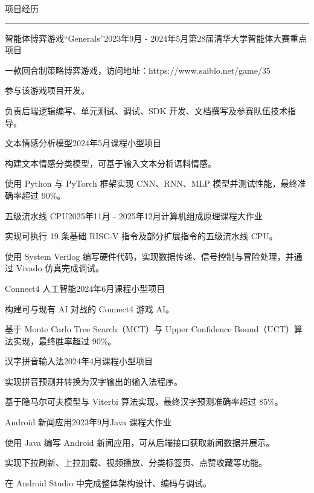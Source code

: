 \documentclass{resume} %
\renewenvironment{rSection}[1]{
\sectionskip
\textcolor{TsinghuaPurple}{\MakeUppercase{#1}}
\sectionlineskip
\hrule
\begin{list}{}{
\setlength{\leftmargin}{0em}
}
\item[]
}{
\end{list}
}
\begin{document}
\begin{rSection}{项目经历}

\begin{rSubsection}{智能体博弈游戏“Generals”}{2023年9月 - 2024年5月}{第28届清华大学智能体大赛重点项目}{}
\item 一款回合制策略博弈游戏，访问地址：https://www.saiblo.net/game/35
\item 参与该游戏项目开发。
\item 负责后端逻辑编写、单元测试、调试、SDK 开发、文档撰写及参赛队伍技术指导。
\end{rSubsection}  

\begin{rSubsection}{文本情感分析模型}{2024年5月}{课程小型项目}{} 
\item 构建文本情感分类模型，可基于输入文本分析语料情感。
\item 使用 Python 与 PyTorch 框架实现 CNN、RNN、MLP 模型并测试性能，最终准确率超过 90\%。
\end{rSubsection}

\begin{rSubsection}{五级流水线 CPU}{2025年11月 - 2025年12月}{计算机组成原理课程大作业}{}
\item 实现可执行 19 条基础 RISC-V 指令及部分扩展指令的五级流水线 CPU。
\item 使用 System Verilog 编写硬件代码，实现数据传递、信号控制与冒险处理，并通过 Vivado 仿真完成调试。
\end{rSubsection}

\begin{rSubsection}{Connect4 人工智能}{2024年6月}{课程小型项目}{}
\item 构建可与现有 AI 对战的 Connect4 游戏 AI。
\item 基于 Monte Carlo Tree Search（MCT）与 Upper Confidence Bound（UCT）算法实现，最终胜率超过 90\%。
\end{rSubsection}

\begin{rSubsection}{汉字拼音输入法}{2024年4月}{课程小型项目}{}    
\item 实现拼音预测并转换为汉字输出的输入法程序。
\item 基于隐马尔可夫模型与 Viterbi 算法实现，最终汉字预测准确率超过 85\%。
\end{rSubsection}

\begin{rSubsection}{Android 新闻应用}{2023年9月}{Java 课程大作业}{}
\item 使用 Java 编写 Android 新闻应用，可从后端接口获取新闻数据并展示。
\item 实现下拉刷新、上拉加载、视频播放、分类标签页、点赞收藏等功能。
\item 在 Android Studio 中完成整体架构设计、编码与调试。
\end{rSubsection}

\end{rSection}
\end{document}
